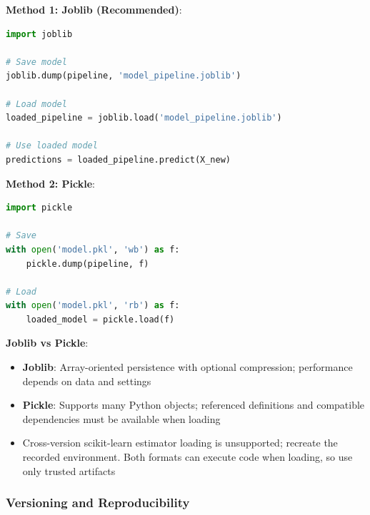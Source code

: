 \documentclass[11pt,twoside]{article}
\numberwithin{equation}{section}
\theoremstyle{plain}
\theoremstyle{definition}
\theoremstyle{remark}
\begin{document}
\begin{implementationbox}
\textbf{Method 1: Joblib (Recommended)}:

\begin{lstlisting}[language=Python]
import joblib

# Save model
joblib.dump(pipeline, 'model_pipeline.joblib')

# Load model
loaded_pipeline = joblib.load('model_pipeline.joblib')

# Use loaded model
predictions = loaded_pipeline.predict(X_new)
\end{lstlisting}

\textbf{Method 2: Pickle}:

\begin{lstlisting}[language=Python]
import pickle

# Save
with open('model.pkl', 'wb') as f:
    pickle.dump(pipeline, f)

# Load
with open('model.pkl', 'rb') as f:
    loaded_model = pickle.load(f)
\end{lstlisting}

\textbf{Joblib vs Pickle}:
\begin{itemize}
\item \textbf{Joblib}: Array-oriented persistence with optional compression; performance depends on data and settings
\item \textbf{Pickle}: Supports many Python objects; referenced definitions and compatible dependencies must be available when loading
\item Cross-version scikit-learn estimator loading is unsupported; recreate the recorded environment. Both formats can execute code when loading, so use only trusted artifacts
\end{itemize}
\end{implementationbox}

\subsubsection{Versioning and Reproducibility}
\end{document}
